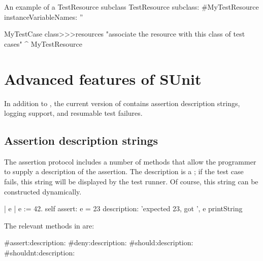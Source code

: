 \documentclass[a4paper,10pt,twoside]{book}
\begin{document}
\begin{classdef}[mytestresource]{An example of a TestResource subclass}
TestResource subclass: #MyTestResource
	instanceVariableNames: ''

MyTestCase class>>>resources
	"associate the resource with this class of test cases"
	^{ MyTestResource }
\end{classdef}






\section{Advanced features of SUnit}
In addition to , the current version of \sunit contains assertion
description strings, logging support, and resumable test failures.

\subsection{Assertion description strings}

The  assertion protocol includes a
number of methods that allow the programmer to supply a description of the assertion.  The description is a ; if the test case
fails, this string will be displayed by the test runner.  Of
course, this string can be constructed dynamically.
\begin{code}{}
| e |
e := 42.
self assert: e = 23
	description: 'expected 23, got ', e printString
\end{code}

The relevant methods in  are:
\begin{code}{}
#assert:description:
#deny:description:
#should:description:
#shouldnt:description:
\end{code}
\end{document}
